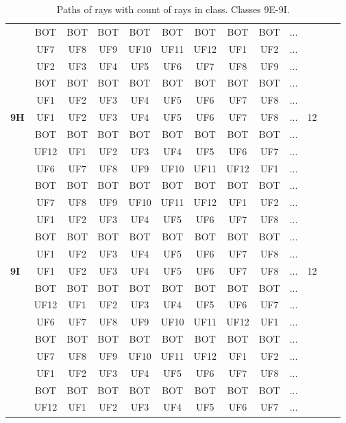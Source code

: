 \begin{table}[h!]
\begin{tabular}{|l|c|c|c|c|c|c|c|c|c|c|c|c|}
 & BOT & BOT & BOT & BOT & BOT & BOT & BOT & BOT & $\dots$ & \\
 & UF7 & UF8 & UF9 & UF10 & UF11 & UF12 & UF1 & UF2 & $\dots$ & \\
 & UF2 & UF3 & UF4 & UF5 & UF6 & UF7 & UF8 & UF9 & $\dots$ & \\
 & BOT & BOT & BOT & BOT & BOT & BOT & BOT & BOT & $\dots$ & \\
 & UF1 & UF2 & UF3 & UF4 & UF5 & UF6 & UF7 & UF8 & $\dots$ & \\
\hline \hline
\textbf{9H} & UF1 & UF2 & UF3 & UF4 & UF5 & UF6 & UF7 & UF8 & $\dots$ & 12\\
 & BOT & BOT & BOT & BOT & BOT & BOT & BOT & BOT & $\dots$ & \\
 & UF12 & UF1 & UF2 & UF3 & UF4 & UF5 & UF6 & UF7 & $\dots$ & \\
 & UF6 & UF7 & UF8 & UF9 & UF10 & UF11 & UF12 & UF1 & $\dots$ & \\
 & BOT & BOT & BOT & BOT & BOT & BOT & BOT & BOT & $\dots$ & \\
 & UF7 & UF8 & UF9 & UF10 & UF11 & UF12 & UF1 & UF2 & $\dots$ & \\
 & UF1 & UF2 & UF3 & UF4 & UF5 & UF6 & UF7 & UF8 & $\dots$ & \\
 & BOT & BOT & BOT & BOT & BOT & BOT & BOT & BOT & $\dots$ & \\
 & UF1 & UF2 & UF3 & UF4 & UF5 & UF6 & UF7 & UF8 & $\dots$ & \\
\hline \hline
\textbf{9I} & UF1 & UF2 & UF3 & UF4 & UF5 & UF6 & UF7 & UF8 & $\dots$ & 12\\
 & BOT & BOT & BOT & BOT & BOT & BOT & BOT & BOT & $\dots$ & \\
 & UF12 & UF1 & UF2 & UF3 & UF4 & UF5 & UF6 & UF7 & $\dots$ & \\
 & UF6 & UF7 & UF8 & UF9 & UF10 & UF11 & UF12 & UF1 & $\dots$ & \\
 & BOT & BOT & BOT & BOT & BOT & BOT & BOT & BOT & $\dots$ & \\
 & UF7 & UF8 & UF9 & UF10 & UF11 & UF12 & UF1 & UF2 & $\dots$ & \\
 & UF1 & UF2 & UF3 & UF4 & UF5 & UF6 & UF7 & UF8 & $\dots$ & \\
 & BOT & BOT & BOT & BOT & BOT & BOT & BOT & BOT & $\dots$ & \\
 & UF12 & UF1 & UF2 & UF3 & UF4 & UF5 & UF6 & UF7 & $\dots$ & \\
\hline 
\end{tabular}
\caption{Paths of rays with count of rays in class. Classes 9E-9I.}
\label{table:TableClasses5}
\end{table}


